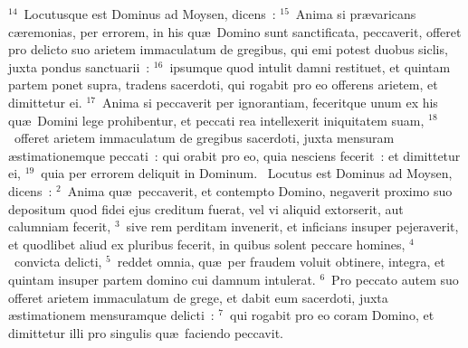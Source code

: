 ${}^{14}$~Locutusque est Dominus ad Moysen, dicens~:
${}^{15}$~Anima si pr\ae varicans c\ae remonias, per errorem, in his qu\ae\ Domino sunt sanctificata, peccaverit, offeret pro delicto suo arietem immaculatum de gregibus, qui emi potest duobus siclis, juxta pondus sanctuarii~:
${}^{16}$~ipsumque quod intulit damni restituet, et quintam partem ponet supra, tradens sacerdoti, qui rogabit pro eo offerens arietem, et dimittetur ei.
${}^{17}$~Anima si peccaverit per ignorantiam, feceritque unum ex his qu\ae\ Domini lege prohibentur, et peccati rea intellexerit iniquitatem suam,
${}^{18}$~offeret arietem immaculatum de gregibus sacerdoti, juxta mensuram \ae stimationemque peccati~: qui orabit pro eo, quia nesciens fecerit~: et dimittetur ei,
${}^{19}$~quia per errorem deliquit in Dominum.
~Locutus est Dominus ad Moysen, dicens~:
${}^{2}$~Anima qu\ae\ peccaverit, et contempto Domino, negaverit proximo suo depositum quod fidei ejus creditum fuerat, vel vi aliquid extorserit, aut calumniam fecerit,
${}^{3}$~sive rem perditam invenerit, et inficians insuper pejeraverit, et quodlibet aliud ex pluribus fecerit, in quibus solent peccare homines,
${}^{4}$~convicta delicti,
${}^{5}$~reddet omnia, qu\ae\ per fraudem voluit obtinere, integra, et quintam insuper partem domino cui damnum intulerat.
${}^{6}$~Pro peccato autem suo offeret arietem immaculatum de grege, et dabit eum sacerdoti, juxta \ae stimationem mensuramque delicti~:
${}^{7}$~qui rogabit pro eo coram Domino, et dimittetur illi pro singulis qu\ae\ faciendo peccavit.


